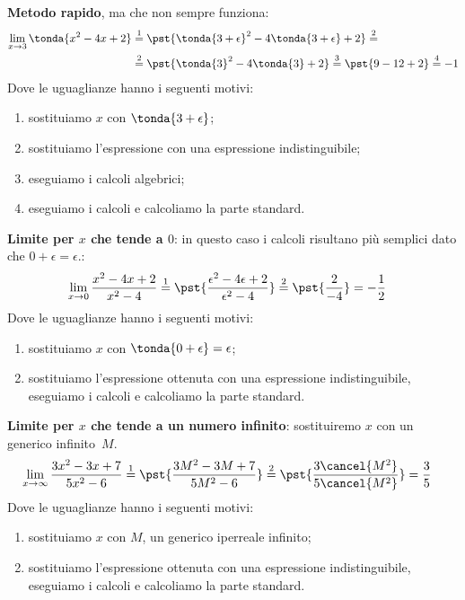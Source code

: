 \begin{esempio}
\textbf{Metodo rapido}, ma che non sempre funziona:
\begin{align*}
\lim_{x \rightarrow 3} \tonda{x^2-4x+2} & \stackrel{1}{=} 
  \pst{\tonda{3+\epsilon}^2-4\tonda{3+\epsilon}+2} \stackrel{2}{=}\\ 
  & \stackrel{2}{=}\pst{\tonda{3}^2-4\tonda{3}+2} \stackrel{3}{=}
  \pst{9 - 12 + 2} \stackrel{4}{=} -1
\end{align*}
Dove le uguaglianze hanno i seguenti motivi:
\begin{enumerate} [nosep]
 \item sostituiamo \(x\) con \(\tonda{3+\epsilon}\);
 \item sostituiamo l'espressione con una espressione indistinguibile;
 \item eseguiamo i calcoli algebrici;
 \item eseguiamo i calcoli e calcoliamo la parte standard.
\end{enumerate}
\end{esempio}

\begin{esempio}
\textbf{Limite per \(x\) che tende a 
\(0\)}:
in questo caso i calcoli risultano più semplici dato che
\(0 + \epsilon = \epsilon\).: 
\begin{align*}
\lim_{x \rightarrow 0} \frac{x^2-4x+2}{x^2-4} & \stackrel{1}{=} 
  \pst{\frac{\epsilon^2-4\epsilon+2}{\epsilon^2-4}} \stackrel{2}{=}  
  \pst{\frac{2}{-4}} = -\frac{1}{2}
\end{align*}
Dove le uguaglianze hanno i seguenti motivi:
\begin{enumerate} [nosep]
 \item sostituiamo \(x\) con \(\tonda{0+\epsilon}=\epsilon\);
 \item sostituiamo l'espressione ottenuta con una espressione 
   indistinguibile, eseguiamo i calcoli e calcoliamo la parte standard.
\end{enumerate}
\end{esempio}

\begin{esempio}
\textbf{Limite per \(x\) che tende a un numero infinito}:
sostituiremo \(x\) con un generico infinito~\(M\).
\begin{align*}
\lim_{x \rightarrow \infty} \frac{3x^2-3x+7}{5x^2-6} & \stackrel{1}{=} 
  \pst{\frac{3M^2-3M+7}{5M^2-6}} \stackrel{2}{=}  
  \pst{\frac{3\cancel{M^2}}{5\cancel{M^2}}} = \frac{3}{5}
\end{align*}
Dove le uguaglianze hanno i seguenti motivi:
\begin{enumerate} [nosep]
 \item sostituiamo \(x\) con \(M\), un generico iperreale infinito;
 \item sostituiamo l'espressione ottenuta con una espressione 
   indistinguibile, eseguiamo i calcoli e calcoliamo la parte standard.
\end{enumerate}
\end{esempio}


